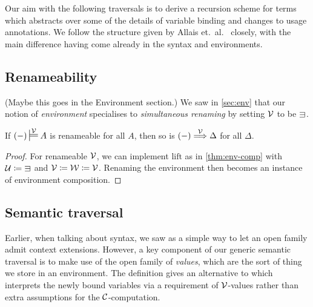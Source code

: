 Our aim with the following traversals is to derive a recursion scheme for
terms which abstracts over some of the details of variable binding and
changes to usage annotations.
We follow the structure given by Allais et.\ al.~\cite{AACMM20} closely, with
the main difference having come already in the syntax and environments.

\subsection{Renameability}

{\color{red}(Maybe this goes in the Environment section.)}
We saw in \cref{sec:env} that our notion of \emph{environment} specialises to
\emph{simultaneous renaming} by setting $\V$ to be $\sqni$.


\begin{lemma}\label{thm:env-ren}
  If $\plr{-} \sdtstile{}\V A$ is renameable for all $A$, then so is
  $\plr{-} \env\V \Delta$ for all $\Delta$.
\end{lemma}
\begin{proof}
  For renameable $\V$, we can implement $\mathrm{lift}$ as in
  \cref{thm:env-comp} with $\U \coloneqq {\sqni}$ and
  $\mathcal V \coloneqq \mathcal W \coloneqq \mathcal V$.
  Renaming the environment then becomes an instance of environment composition.
\end{proof}

\subsection{Semantic traversal}

Earlier, when talking about syntax, we saw  as a simple way
to let an open family admit context extensions.
However, a key component of our generic semantic traversal is to make use of
the open family \AgdaBound{$\V$} of \emph{values}, which are the sort of thing
we store in an environment.
The definition  gives an alternative to
 which interprets the newly bound variables via a
requirement of $\V$-values rather than extra assumptions for the
$\mathcal C$-computation.


